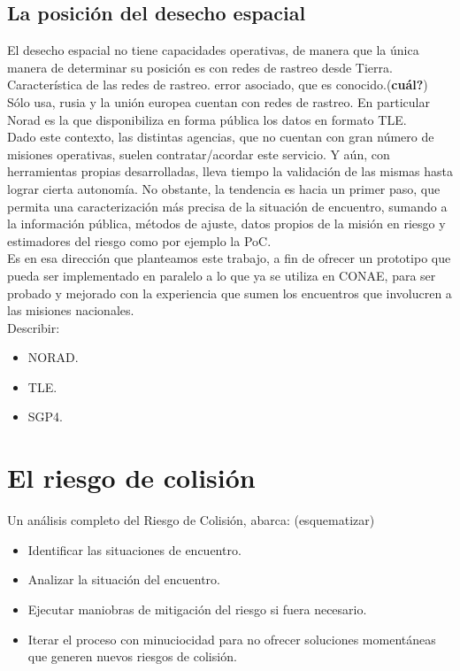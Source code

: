 \subsection{La posici\'on del desecho espacial}
El desecho espacial no tiene capacidades operativas, de manera que la \'unica manera de determinar su posici\'on es con redes de rastreo desde Tierra.\\
Caracter\'istica de las redes de rastreo. error asociado, que es conocido.({\bf{cu\'al?}})\\
S\'olo usa, rusia y la uni\'on europea cuentan con redes de rastreo. En particular Norad es la que disponibiliza en forma p\'ublica los datos en formato TLE.\\
Dado este contexto, las distintas agencias, que no cuentan con gran n\'umero de misiones operativas, suelen contratar/acordar este servicio. Y a\'un, con herramientas propias desarrolladas, lleva tiempo la validaci\'on de las mismas hasta lograr cierta autonom\'ia. No obstante, la tendencia es hacia un primer paso, que permita una caracterizaci\'on m\'as precisa de la situaci\'on de encuentro, sumando a la informaci\'on p\'ublica, m\'etodos de ajuste, datos propios de la misi\'on en riesgo y estimadores del riesgo como por ejemplo la \ac{PoC}.\\
Es en esa direcci\'on que planteamos este trabajo, a fin de ofrecer un prototipo que pueda ser implementado en paralelo a lo que ya se utiliza en CONAE, para ser probado y mejorado con la experiencia que sumen los encuentros que involucren a las misiones nacionales.\\
Describir:\\
\begin{itemize}
\item NORAD.
\item TLE.
\item SGP4.
\end{itemize}


\section{El riesgo de colisi\'on}
Un an\'alisis completo del Riesgo de Colisi\'on, abarca: (esquematizar)

\begin{itemize}
\item Identificar las situaciones de encuentro.
\item Analizar la situaci\'on del encuentro.
\item Ejecutar maniobras de mitigaci\'on del riesgo si fuera necesario.
\item Iterar el proceso con minuciocidad para no ofrecer soluciones moment\'aneas que generen nuevos riesgos de colisi\'on.
\end{itemize}

